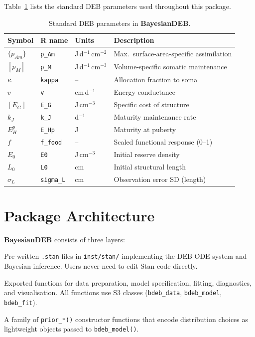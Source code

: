 \documentclass[11pt,a4paper]{article}
\newcommand{\pkg}[1]{\textbf{#1}}
\newcommand{\fn}[1]{\texttt{#1()}}
\newcommand{\code}[1]{\texttt{#1}}
\begin{document}
Table~\ref{tab:params} lists the standard DEB parameters used throughout
this package.

\begin{table}[htbp]
\centering
\caption{Standard DEB parameters in \pkg{BayesianDEB}.}
\label{tab:params}
\begin{tabular}{llll}
\toprule
\textbf{Symbol} & \textbf{R name} & \textbf{Units} & \textbf{Description} \\
\midrule
$\{p_{Am}\}$ & \code{p\_Am} & J\,d$^{-1}$\,cm$^{-2}$ & Max.\ surface-area-specific assimilation \\
$[p_M]$      & \code{p\_M}  & J\,d$^{-1}$\,cm$^{-3}$ & Volume-specific somatic maintenance \\
$\kappa$     & \code{kappa} & -- & Allocation fraction to soma \\
$v$          & \code{v}     & cm\,d$^{-1}$ & Energy conductance \\
$[E_G]$      & \code{E\_G}  & J\,cm$^{-3}$ & Specific cost of structure \\
$k_J$        & \code{k\_J}  & d$^{-1}$ & Maturity maintenance rate \\
$E_H^p$      & \code{E\_Hp} & J & Maturity at puberty \\
$f$          & \code{f\_food} & -- & Scaled functional response (0--1) \\
$E_0$        & \code{E0}    & J\,cm$^{-3}$ & Initial reserve density \\
$L_0$        & \code{L0}    & cm & Initial structural length \\
$\sigma_L$   & \code{sigma\_L} & cm & Observation error SD (length) \\
\bottomrule
\end{tabular}
\end{table}

\section{Package Architecture}
\label{sec:architecture}

\pkg{BayesianDEB} consists of three layers:

\begin{description}[style=nextline]
  \item[Stan models] Pre-written \code{.stan} files in \code{inst/stan/}
    implementing the DEB ODE system and Bayesian inference.  Users never
    need to edit Stan code directly.
  \item[R interface] Exported functions for data preparation, model
    specification, fitting, diagnostics, and visualisation.  All functions
    use S3 classes (\code{bdeb\_data}, \code{bdeb\_model}, \code{bdeb\_fit}).
  \item[Prior system] A family of \code{prior\_*()} constructor functions
    that encode distribution choices as lightweight objects passed to
    \fn{bdeb\_model}.
\end{description}
\end{document}
